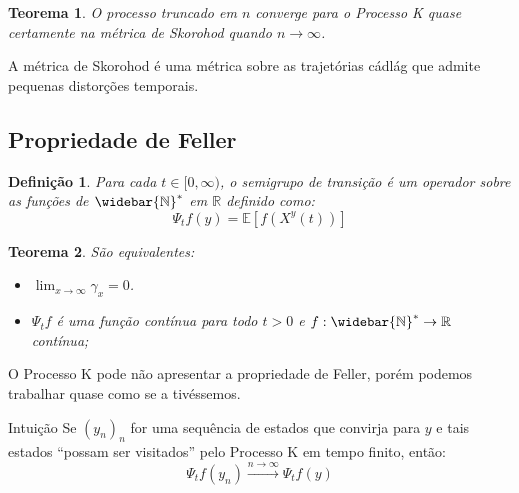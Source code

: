 \documentclass[xcolor=pdftex,dvipsnames]{beamer}
\newcommand{\Nzb}{{\mathbb{\widebar{N}^*}}}
\newcommand{\R}{{\mathbb{R}}}
\newcommand{\E}{{\mathbb{E}}}
\newtheorem{teorema}{Teorema}
\newtheorem{definicao}{Definição}
\begin{document}
\begin{frame}
  \begin{teorema}
    O processo truncado em $n$ converge para o Processo K quase
    certamente na métrica de Skorohod quando $n \to \infty$.
  \end{teorema}

  A métrica de Skorohod é uma métrica sobre as trajetórias cádlág que
  admite pequenas distorções temporais.
\end{frame}


\subsection{Propriedade de Feller}

\begin{frame}

  \begin{definicao}
    Para cada $t \in [0, \infty)$, o semigrupo de transição é um
    operador sobre as funções de $\Nzb$ em $\R$ definido como:
    \begin{displaymath}
      \Psi_t f (y) = \E \left[ f(X^y(t)) \right]
    \end{displaymath}
  \end{definicao} \pause

  \begin{teorema}
    São equivalentes:
    \begin{itemize}
    \item $\displaystyle \lim_{x \to \infty} \gamma_x = 0$.
    \item $\Psi_t f$ é uma função contínua para todo $t > 0$ e $f:
      \Nzb \to \R$ contínua;
    \end{itemize}
  \end{teorema}
\end{frame}

\begin{frame}

  O Processo K pode não apresentar a propriedade de Feller, porém
  podemos trabalhar quase como se a tivéssemos.


  \begin{block}{Intuição}
    Se $(y_n)_n$ for uma sequência de estados que convirja para $y$ e
    tais estados ``possam ser visitados'' pelo Processo K em tempo
    finito, então:
    \begin{displaymath}  
      \Psi_t f (y_n) \xrightarrow{n \to \infty} \Psi_t f (y)
    \end{displaymath}
  \end{block}
\end{frame}
\end{document}
